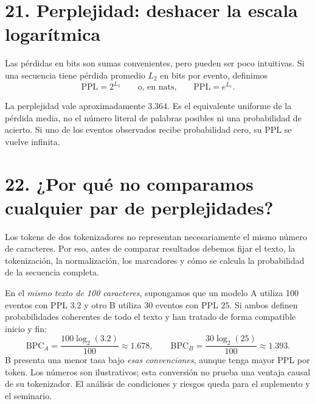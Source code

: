 \section*{21. Perplejidad: deshacer la escala logarítmica}
Las pérdidas en bits son sumas convenientes, pero pueden ser poco intuitivas. Si una secuencia tiene pérdida promedio $L_2$ en bits por evento, definimos
\[
\boxed{\mathrm{PPL}=2^{L_2}}\qquad \text{o, en nats,}\qquad \boxed{\mathrm{PPL}=e^{L_e}}.
\]
\begin{center}
\end{center}
La perplejidad vale aproximadamente $3.364$. Es el equivalente uniforme de la pérdida media, no el número literal de palabras posibles ni una probabilidad de acierto. Si uno de los eventos observados recibe probabilidad cero, su PPL se vuelve infinita.

\section*{22. ¿Por qué no comparamos cualquier par de perplejidades?}
Los tokens de dos tokenizadores no representan necesariamente el mismo número de caracteres. Por eso, antes de comparar resultados debemos fijar el texto, la tokenización, la normalización, los marcadores y cómo se calcula la probabilidad de la secuencia completa.
\begin{ejemplo}
En el \emph{mismo texto de 100 caracteres}, supongamos que un modelo A utiliza 100 eventos con PPL $3.2$ y otro B utiliza 30 eventos con PPL $25$. Si ambos definen probabilidades coherentes de todo el texto y han tratado de forma compatible inicio y fin:
\[
\mathrm{BPC}_A=\frac{100\log_2(3.2)}{100}\approx1.678,
\qquad
\mathrm{BPC}_B=\frac{30\log_2(25)}{100}\approx1.393.
\]
B presenta una menor tasa bajo \emph{esas convenciones}, aunque tenga mayor PPL por token. Los números son ilustrativos; esta conversión no prueba una ventaja causal de su tokenizador. El análisis de condiciones y riesgos queda para el suplemento y el seminario.
\end{ejemplo}

